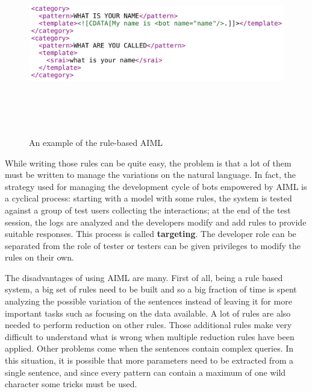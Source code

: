 
\begin{figure}[!htbp]
    \centering
    \includegraphics[max width=\linewidth,max height=8cm,keepaspectratio]{figures/aimlExample}
    \caption{An example of the rule-based AIML}\label{fig:aimlExample}
\end{figure}

While writing those rules can be quite easy, the problem is that a lot of them must be written to manage the variations on the natural language. In fact, the strategy used for managing the development cycle of bots empowered by AIML is a cyclical process: starting with a model with some rules, the system is tested against a group of test users collecting the interactions; at the end of the test session, the logs are analyzed and the developers modify and add rules to provide suitable responses. This process is called \textbf{targeting}. The developer role can be separated from the role of tester or testers can be given privileges to modify the rules on their own.

The disadvantages of using AIML are many. First of all, being a rule based system, a big set of rules need to be built and so a big fraction of time is spent analyzing the possible variation of the sentences instead of leaving it for more important tasks such as focusing on the data available. A lot of rules are also needed to perform reduction on other rules. Those additional rules make very difficult to understand what is wrong when multiple reduction rules have been applied. Other problems come when the sentences contain complex queries. In this situation, it is possible that more parameters need to be extracted from a single sentence, and since every pattern can contain a maximum of one wild character some tricks must be used.

